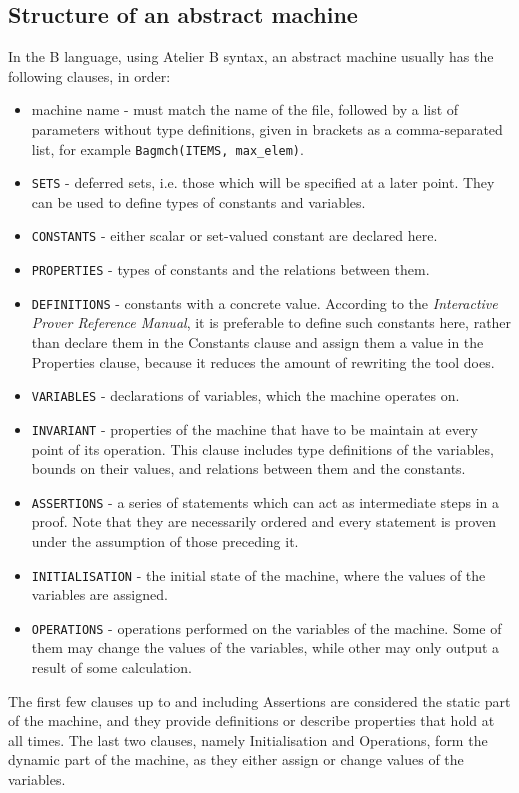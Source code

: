 \documentclass[11pt,journal]{IEEEtran}
\begin{document}
	\subsection{Structure of an abstract machine}
	In the B language, using Atelier B syntax, an abstract machine usually has the following clauses, in order:
	\begin{itemize}
		\item machine name - must match the name of the file, followed by a list of parameters without type definitions, given in brackets as a comma-separated list, for example \texttt{Bagmch(ITEMS, max\_elem)}.
		\item \texttt{SETS} - deferred sets, i.e. those which will be specified at a later point. They can be used to define types of constants and variables.
		\item \texttt{CONSTANTS} - either scalar or set-valued constant are declared here.
		\item \texttt{PROPERTIES} - types of constants and the relations between them. 
		\item \texttt{DEFINITIONS} - constants with a concrete value. According to the \emph{Interactive Prover Reference Manual}, it is preferable to define such constants here, rather than declare them in the Constants clause and assign them a value in the Properties clause, because it reduces the amount of rewriting the tool does.\cite{Prover guide} 
		\item \texttt{VARIABLES} - declarations of variables, which the machine operates on.
		\item \texttt{INVARIANT} - properties of the machine that have to be maintain at every point of its operation. This clause includes type definitions of the variables, bounds on their values, and relations between them and the constants.
		\item \texttt{ASSERTIONS} - a series of statements which can act as intermediate steps in a proof. Note that they are necessarily ordered and every statement is proven under the assumption of those preceding it.
		\item \texttt{INITIALISATION} - the initial state of the machine, where the values of the variables are assigned.
		\item \texttt{OPERATIONS} - operations performed on the variables of the machine. Some of them may change the values of the variables, while other may only output a result of some calculation.
	\end{itemize}

	The first few clauses up to and including Assertions are considered the static part of the machine, and they provide definitions or describe properties that hold at all times. The last two clauses, namely Initialisation and Operations, form the dynamic part of the machine, as they either assign or change values of the variables.
	
\end{document}
